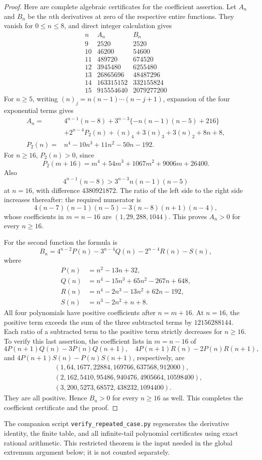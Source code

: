 \documentclass[11pt]{article}
\begin{document}
\begin{proof}
Here are complete algebraic certificates for the coefficient assertion.
Let $A_n$ and $B_n$ be the $n$th derivatives at zero of the respective
entire functions. They vanish for $0\leq n\leq8$, and direct integer
calculation gives
\[
\begin{array}{c|r|r}
n&A_n&B_n\\\hline
9&2520&2520\\
10&46200&54600\\
11&489720&674520\\
12&3945480&6255480\\
13&26865696&48487296\\
14&163315152&332155824\\
15&915554640&2079277200
\end{array}
\]
For $n\geq5$, writing $(n)_j=n(n-1)\cdots(n-j+1)$, expansion of the
four exponential terms gives
\begin{align*}
 A_n={}&4^{n-1}(n-8)
 +3^{n-3}\{-n(n-1)(n-5)+216\}\\
 &+2^{n-4}P_2(n)+(n)_4+3(n)_3+3(n)_2+8n+8,\\
 P_2(n)={}&n^4-10n^3+11n^2-50n-192.
\end{align*}
For $n\geq16$, $P_2(n)>0$, since
\[
P_2(m+16)=m^4+54m^3+1067m^2+9006m+26400.
\]
Also
\[
4^{n-1}(n-8)>3^{n-3}n(n-1)(n-5)
\]
at $n=16$, with difference $4380921872$.
The ratio of the left side to the right side increases
thereafter: the required numerator is
\[
 4(n-7)(n-1)(n-5)-3(n-8)(n+1)(n-4),
\]
whose coefficients in $m=n-16$ are $(1,29,288,1044)$.
This proves $A_n>0$ for every $n\geq16$.

For the second function the formula is
\[
 B_n=4^{n-2}P(n)-3^{n-4}Q(n)-2^{n-4}R(n)-S(n),
\]
where
\begin{align*}
P(n)&=n^2-13n+32,\\
Q(n)&=n^4-15n^3+65n^2-267n+648,\\
R(n)&=n^4-2n^3-13n^2+62n-192,\\
S(n)&=n^3-2n^2+n+8.
\end{align*}
All four polynomials have positive coefficients after $n=m+16$.
At $n=16$, the positive term exceeds the sum of the three subtracted
terms by $12156288144$. Each ratio of a subtracted term to the positive
term strictly decreases for $n\geq16$. To verify this last assertion,
the coefficient lists in $m=n-16$ of
\[
4P(n+1)Q(n)-3P(n)Q(n+1),\quad
4P(n+1)R(n)-2P(n)R(n+1),
\]
and $4P(n+1)S(n)-P(n)S(n+1)$, respectively, are
\begin{align*}
 &(1,64,1677,22884,169766,637568,912000),\\
 &(2,162,5410,95486,940476,4905664,10598400),\\
 &(3,200,5273,68572,438232,1094400).
\end{align*}
They are all positive. Hence $B_n>0$ for every $n\geq16$ as well.
This completes the coefficient certificate and the proof.
\end{proof}
The companion script \texttt{verify\_repeated\_case.py} regenerates the
derivative identity, the finite table, and all infinite-tail polynomial
certificates using exact rational arithmetic. This restricted theorem is the
input needed in the global extremum argument below; it is not counted separately.
\end{document}
